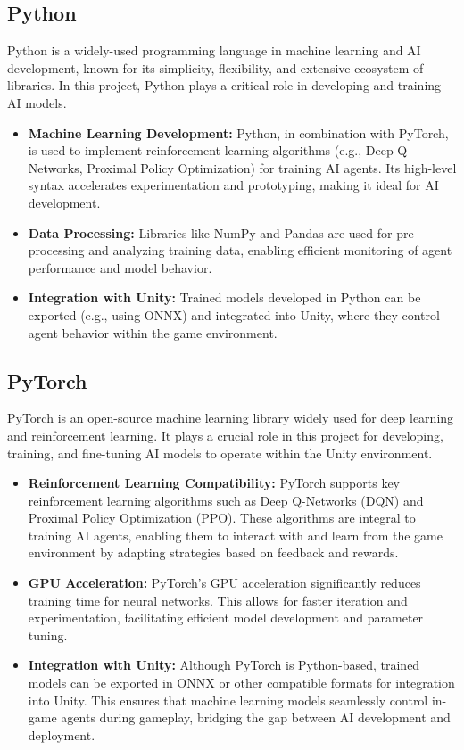 \documentclass[12pt,oneside,openright,a4paper]{cpe-english-project}
\begin{document}
\subsection{Python}
Python is a widely-used programming language in machine learning and AI development, known for its simplicity, flexibility, and extensive ecosystem of libraries. In this project, Python plays a critical role in developing and training AI models.
\begin{itemize}
\item  \textbf{Machine Learning Development:} Python, in combination with PyTorch, is used to implement reinforcement learning algorithms (e.g., Deep Q-Networks, Proximal Policy Optimization) for training AI agents. Its high-level syntax accelerates experimentation and prototyping, making it ideal for AI development.
\item  \textbf{Data Processing:} Libraries like NumPy and Pandas are used for pre-processing and analyzing training data, enabling efficient monitoring of agent performance and model behavior.
\item  \textbf{Integration with Unity:} 
Trained models developed in Python can be exported (e.g., using ONNX) and integrated into Unity, where they control agent behavior within the game environment.
\end{itemize}

\subsection{PyTorch}
PyTorch is an open-source machine learning library widely used for deep learning and reinforcement learning. It plays a crucial role in this project for developing, training, and fine-tuning AI models to operate within the Unity environment.
\begin{itemize}
\item  \textbf{Reinforcement Learning Compatibility:}
PyTorch supports key reinforcement learning algorithms such as Deep Q-Networks (DQN) and Proximal Policy Optimization (PPO). These algorithms are integral to training AI agents, enabling them to interact with and learn from the game environment by adapting strategies based on feedback and rewards.
\item  \textbf{GPU Acceleration:}
PyTorch’s GPU acceleration significantly reduces training time for neural networks. This allows for faster iteration and experimentation, facilitating efficient model development and parameter tuning.
\item  \textbf{Integration with Unity:}
Although PyTorch is Python-based, trained models can be exported in ONNX or other compatible formats for integration into Unity. This ensures that machine learning models seamlessly control in-game agents during gameplay, bridging the gap between AI development and deployment.
\end{itemize}
\end{document}
